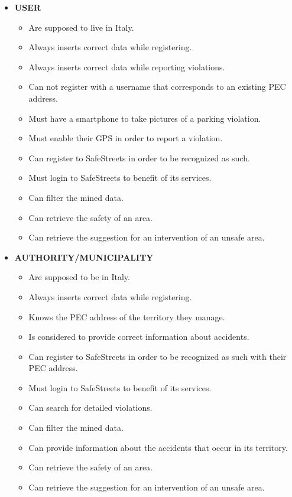 	\begin{itemize}
		\item \textbf{USER}
			\begin{itemize}
				\item Are supposed to live in Italy.
				\item Always inserts correct data while registering.
				\item Always inserts correct data while reporting violations.
				\item Can not register with a username that corresponds to an existing PEC address.
				\item Must have a smartphone to take pictures of a parking violation.
				\item Must enable their GPS in order to report a violation.
				\item Can register to SafeStreets in order to be recognized as such.
				\item Must login to SafeStreets to benefit of its services.
				\item Can filter the mined data.
				\item Can retrieve the safety of an area.
				\item Can retrieve the suggestion for an intervention of an unsafe area.
			\end{itemize}
		\item \textbf{AUTHORITY/MUNICIPALITY}
			\begin{itemize}
				\item Are supposed to be in Italy.
				\item Always inserts correct data while registering.
				\item Knows the PEC address of the territory they manage.
				\item Is considered to provide correct information about accidents.
				\item Can register to SafeStreets in order to be recognized as such with their PEC address.
				\item Must login to SafeStreets to benefit of its services.
				\item Can search for detailed violations.
				\item Can filter the mined data.
				\item Can provide information about the accidents that occur in its territory.
				\item Can retrieve the safety of an area.
				\item Can retrieve the suggestion for an intervention of an unsafe area.
			\end{itemize}
	\end{itemize}
	
